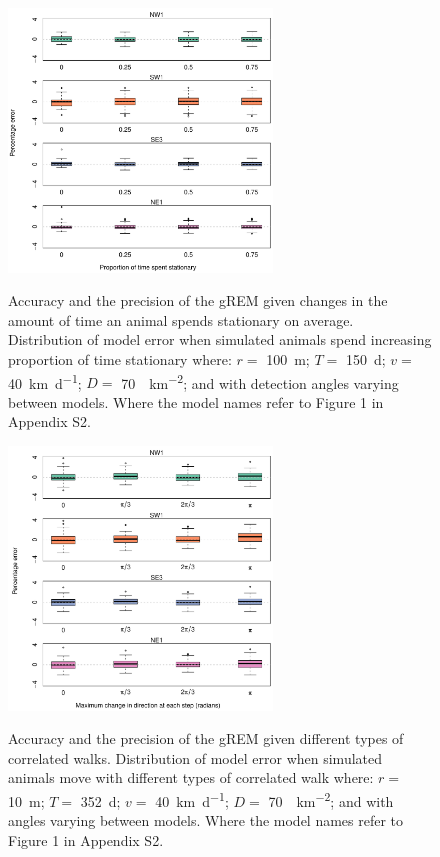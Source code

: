 \documentclass[a4paper,10pt,reqno,oneside]{amsart}
\begin{document}
\begin{figure}[t]
      \centering
	\includegraphics[width=7cm]{imgs/ResultsPerch.pdf}
          \label{f:Perch}
	\caption{Accuracy and the precision of the gREM given changes in the amount of time an animal spends stationary on average. Distribution of model error when simulated animals spend increasing proportion of time stationary where:  $r = $ \SI{100}{\meter}; $T = $ \SI{150}{\day}; $v = $ \SI{40}{\kilo\meter\per\day}; $D = $ \SI{70}{\animals\per\kilo\meter\squared}; and with detection angles varying between models. Where the model names refer to Figure 1 in Appendix S2. } 
\end{figure}

\begin{figure}[t]
                \centering
		\includegraphics[width=7cm]{imgs/ResultsTort.pdf}
                \label{f:Tort}
	\caption{Accuracy and the precision of the gREM given different types of correlated walks. Distribution of model error when simulated animals move with different types of correlated walk where:  $r = $ \SI{10}{\meter}; $T = $ \SI{352}{\day}; $v = $ \SI{40}{\kilo\meter\per\day}; $D = $ \SI{70}{\animals\per\kilo\meter\squared}; and with angles varying between models. Where the model names refer to Figure 1 in Appendix S2.} 
\end{figure}
\end{document}
